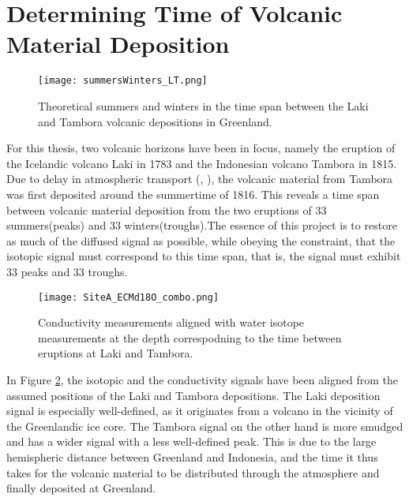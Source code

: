 \documentclass[../../CompleteThesis2/Complete_2ndDraft]{subfiles}
\begin{document}
\section[Volcanic Horizons][Volcanic Horizons]{Determining Time of Volcanic Material Deposition}
\label{Sec:Data_VolcanicHorizons}

\begin{figure}[h]
	\centering
	\texttt{[image: summersWinters\_LT.png]}
	\caption[Summers and Winters between Laki and Tambora]{\small Theoretical summers and winters in the time span between the Laki and Tambora volcanic depositions in Greenland.}
	\label{Fig:SummersAndWintersLT}
\end{figure}

For this thesis, two volcanic horizons have been in focus, namely the eruption of the Icelandic volcano Laki in 1783 and the Indonesian volcano Tambora in 1815. Due to delay in atmospheric transport (\cite[Wei et al., 2008]{Wei2008}, \cite[Cole-Dai et al, 2009]{Dai2009}), the volcanic material from Tambora was first deposited around the summertime of 1816. This reveals a time span between volcanic material deposition from the two eruptions of 33 summers(peaks) and 33 winters(troughs).The essence of this project is to restore as much of the diffused signal as possible, while obeying the constraint, that the isotopic signal must correspond to this time span, that is, the signal must exhibit 33 peaks and 33 troughs.


\begin{figure}[h]
	\centering
	\texttt{[image: SiteA\_ECMd18O\_combo.png]}
	\caption[ECM and $\delta^{18}$O data between Laki and Tambora, Site A.]{\small Conductivity measurements aligned with water isotope measurements at the depth correspodning to the time between eruptions at Laki and Tambora.}
	\label{Fig:DATA_SiteA_ECM_d18O_combo}
\end{figure}
In Figure \ref{Fig:DATA_SiteA_ECM_d18O_combo}, the isotopic and the conductivity signals have been aligned from the assumed positions of the Laki and Tambora depositions. The Laki deposition signal is especially well-defined, as it originates from a volcano in the vicinity of the Greenlandic ice core. The Tambora signal on the other hand is more smudged and has a wider signal with a less well-defined peak. This is due to the large hemispheric distance between Greenland and Indonesia, and the time it thus takes for the volcanic material to be distributed through the atmosphere and finally deposited at Greenland.
\end{document}
